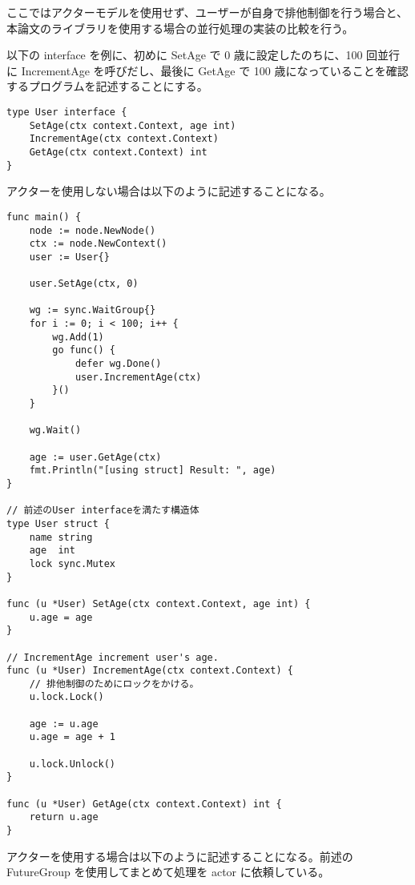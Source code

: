 ここではアクターモデルを使用せず、ユーザーが自身で排他制御を行う場合と、本論文のライブラリを使用する場合の並行処理の実装の比較を行う。

以下の interface を例に、初めに SetAge で 0 歳に設定したのちに、100
回並行に IncrementAge を呼びだし、最後に GetAge で 100
歳になっていることを確認するプログラムを記述することにする。

\begin{verbatim}
type User interface {
    SetAge(ctx context.Context, age int)
    IncrementAge(ctx context.Context)
    GetAge(ctx context.Context) int
}
\end{verbatim}

アクターを使用しない場合は以下のように記述することになる。

\begin{verbatim}
func main() {
    node := node.NewNode()
    ctx := node.NewContext()
    user := User{}

    user.SetAge(ctx, 0)

    wg := sync.WaitGroup{}
    for i := 0; i < 100; i++ {
        wg.Add(1)
        go func() {
            defer wg.Done()
            user.IncrementAge(ctx)
        }()
    }

    wg.Wait()

    age := user.GetAge(ctx)
    fmt.Println("[using struct] Result: ", age)
}

// 前述のUser interfaceを満たす構造体
type User struct {
    name string
    age  int
    lock sync.Mutex
}

func (u *User) SetAge(ctx context.Context, age int) {
    u.age = age
}

// IncrementAge increment user's age.
func (u *User) IncrementAge(ctx context.Context) {
    // 排他制御のためにロックをかける。
    u.lock.Lock()

    age := u.age
    u.age = age + 1

    u.lock.Unlock()
}

func (u *User) GetAge(ctx context.Context) int {
    return u.age
}
\end{verbatim}

アクターを使用する場合は以下のように記述することになる。前述の
FutureGroup を使用してまとめて処理を actor に依頼している。

